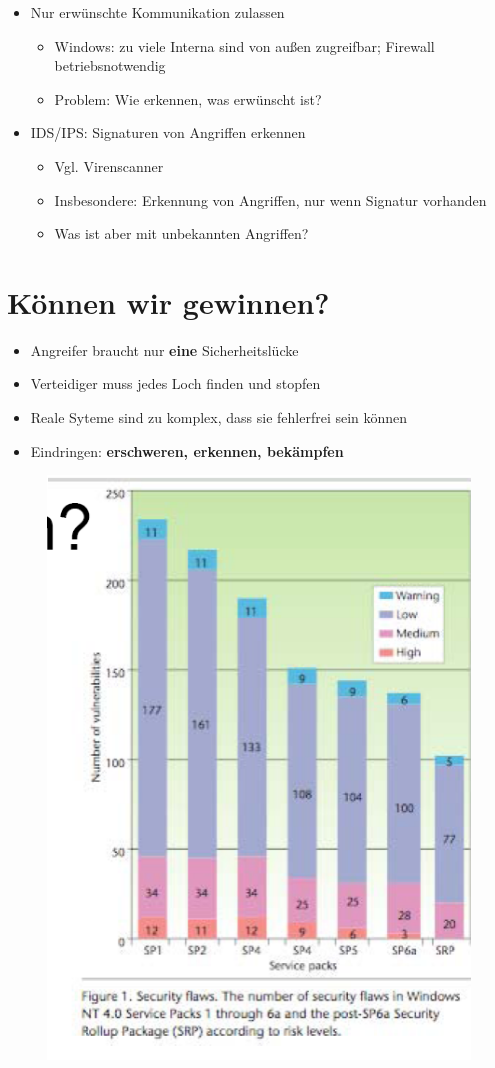 \documentclass[openany]{book}
\begin{document}
\begin{itemize}
    \item Nur erwünschte Kommunikation zulassen
    \begin{itemize}
        \item Windows: zu viele Interna sind von außen zugreifbar; Firewall betriebsnotwendig
        \item Problem: Wie erkennen, was erwünscht ist?
    \end{itemize}
    \item IDS/IPS: Signaturen von Angriffen erkennen
    \begin{itemize}
        \item Vgl. Virenscanner
        \item Insbesondere: Erkennung von Angriffen, nur wenn Signatur vorhanden
        \item Was ist aber mit unbekannten Angriffen?
    \end{itemize}
\end{itemize}

\section{Können wir gewinnen?}

\begin{itemize}
    \item Angreifer braucht nur \textbf{eine} Sicherheitslücke
    \item Verteidiger muss jedes Loch finden und stopfen
    \item Reale Syteme sind zu komplex, dass sie fehlerfrei sein können
    \item Eindringen: \textbf{erschweren, erkennen, bekämpfen}
\end{itemize}

\newpage

\begin{figure}[h!]
    \centering
    \includegraphics[width=0.5\linewidth]{Pics/WindowsVulns.png}
\end{figure}
\end{document}
